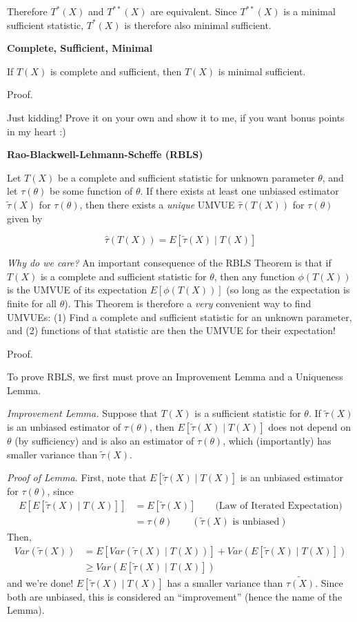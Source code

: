 \documentclass[
  letterpaper,
  DIV=11,
  numbers=noendperiod]{scrreprt}
\begin{document}
Therefore \(T^*(X)\) and \(T^{**}(X)\) are equivalent. Since
\(T^{**}(X)\) is a minimal sufficient statistic, \(T^*(X)\) is therefore
also minimal sufficient.

\textbf{Complete, Sufficient, Minimal}

If \(T(X)\) is complete and sufficient, then \(T(X)\) is minimal
sufficient.

Proof.

Just kidding! Prove it on your own and show it to me, if you want bonus
points in my heart :)

\textbf{Rao-Blackwell-Lehmann-Scheffe (RBLS)}

Let \(T(X)\) be a complete and sufficient statistic for unknown
parameter \(\theta\), and let \(\tau(\theta)\) be some function of
\(\theta\). If there exists at least one unbiased estimator
\(\tilde{\tau}(X)\) for \(\tau(\theta)\), then there exists a
\emph{unique} UMVUE \(\hat{\tau}(T(X))\) for \(\tau(\theta)\) given by

\[
\hat{\tau}(T(X)) = E[\tilde{\tau}(X) \mid T(X)]
\]

\emph{Why do we care?} An important consequence of the RBLS Theorem is
that if \(T(X)\) is a complete and sufficient statistic for \(\theta\),
then any function \(\phi(T(X))\) is the UMVUE of its expectation
\(E[\phi(T(X))]\) (so long as the expectation is finite for all
\(\theta\)). This Theorem is therefore a \emph{very} convenient way to
find UMVUEs: (1) Find a complete and sufficient statistic for an unknown
parameter, and (2) functions of that statistic are then the UMVUE for
their expectation!

Proof.

To prove RBLS, we first must prove an Improvement Lemma and a Uniqueness
Lemma.

\emph{Improvement Lemma.} Suppose that \(T(X)\) is a sufficient
statistic for \(\theta\). If \(\tilde{\tau}(X)\) is an unbiased
estimator of \(\tau(\theta)\), then \(E[\tilde{\tau}(X) \mid T(X)]\)
does not depend on \(\theta\) (by sufficiency) and is also an estimator
of \(\tau(\theta)\), which (importantly) has smaller variance than
\(\tilde{\tau}(X)\).

\emph{Proof of Lemma.} First, note that \(E[\tilde{\tau}(X) \mid T(X)]\)
is an unbiased estimator for \(\tau(\theta)\), since \begin{align*}
    E[E[\tilde{\tau}(X) \mid T(X)]] & = E[\tilde{\tau}(X)] \quad \quad \text{(Law of Iterated Expectation)} \\
    & = \tau(\theta) \quad \quad (\tilde{\tau}(X) \text{ is unbiased})
\end{align*} Then, \begin{align*}
    Var(\tilde{\tau}(X)) & = E[Var(\tilde{\tau}(X) \mid T(X))] + Var(E[\tilde{\tau}(X) \mid T(X)]) \\
    & \geq Var(E[\tilde{\tau}(X) \mid T(X)])
\end{align*} and we're done! \(E[\tilde{\tau}(X) \mid T(X)]\) has a
smaller variance than \(\tilde{\tau(X)}\). Since both are unbiased, this
is considered an ``improvement'' (hence the name of the Lemma).
\end{document}
